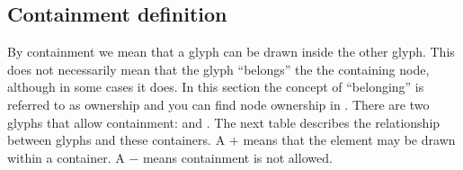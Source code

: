 \subsection{Containment definition}
\label{sec:containment}

By containment we mean that a glyph can be drawn inside the other glyph. This does not necessarily mean that the glyph ``belongs'' the the containing node, although in some cases it does. In this section the concept of ``belonging'' is referred to as ownership and you can find node ownership in . There are two glyphs that allow containment:  and . The next table describes the relationship between \PD glyphs and these containers. A $+$ means that the element may be drawn within a container. A $-$ means containment is not allowed.

